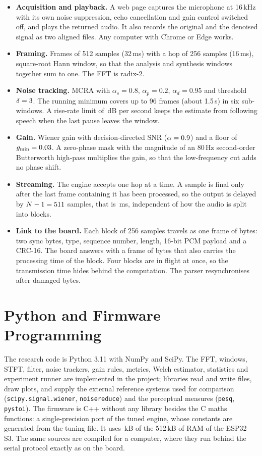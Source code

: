 \documentclass[11pt,a4paper]{article}
\numberwithin{figure}{section}
\numberwithin{table}{section}
\numberwithin{equation}{section}
\newcommand{\dB}{\,dB}
\newcommand{\file}[1]{\texttt{#1}}
\begin{document}
\begin{itemize}
\item \textbf{Acquisition and playback.} A web page captures the microphone at 16\,kHz with its own noise
suppression, echo cancellation and gain control switched off, and plays the returned audio. It also
records the original and the denoised signal as two aligned files. Any computer with Chrome or Edge works.
\item \textbf{Framing.} Frames of 512 samples (32\,ms) with a hop of 256 samples (16\,ms), square-root
Hann window, so that the analysis and synthesis windows together sum to one. The FFT is radix-2.
\item \textbf{Noise tracking.} MCRA with $\alpha_s=0.8$, $\alpha_p=0.2$, $\alpha_d=0.95$ and threshold
$\delta=3$. The running minimum covers up to 96 frames (about 1.5\,s) in six sub-windows. A rise-rate
limit of \valRiseLimit\dB{} per second keeps the estimate from following speech when the last pause leaves the window.
\item \textbf{Gain.} Wiener gain with decision-directed SNR ($\alpha=0.9$) and a floor of
$g_\mathrm{min}=0.03$. A zero-phase mask with the magnitude of an 80\,Hz second-order Butterworth
high-pass multiplies the gain, so that the low-frequency cut adds no phase shift.
\item \textbf{Streaming.} The engine accepts one hop at a time. A sample is final only after the last frame
containing it has been processed, so the output is delayed by $N-1=511$ samples, that is
\valDelayMs\,ms, independent of how the audio is split into blocks.
\item \textbf{Link to the board.} Each block of 256 samples travels as one frame of \valFwUpBytes{} bytes:
two sync bytes, type, sequence number, length, 16-bit PCM payload and a CRC-16. The board answers with a frame of
\valFwDownBytes{} bytes that also carries the processing time of the block. Four blocks are in flight at once, so
the transmission time hides behind the computation. The parser resynchronises after damaged bytes.
\end{itemize}

\section{Python and Firmware Programming}
The research code is Python 3.11 with NumPy and SciPy. The FFT, windows, STFT, filter, noise trackers,
gain rules, metrics, Welch estimator, statistics and experiment runner are implemented in the project;
libraries read and write files, draw plots, and supply the external reference systems used for
comparison (\file{scipy.signal.wiener}, \file{noisereduce}) and the perceptual measures
(\file{pesq}, \file{pystoi}). The firmware is C++ without any library besides the C maths functions: a
single-precision port of the tuned engine, whose constants are generated from the tuning file. It uses
\valFwEngineKb\,kB of the 512\,kB of RAM of the ESP32-S3. The same sources are compiled for a computer, where they run
behind the serial protocol exactly as on the board. 
\end{document}
